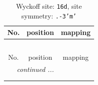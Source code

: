 \documentclass[fleqn,8pt]{jsarticle}
\begin{document}
\renewcommand{\arraystretch}{1.2}
\begin{longtable}{ccc}
\caption{Wyckoff site: {\tt 16d}, site symmetry: {\tt .-3'm'}}
 \\
 \hline \hline
No. & position & mapping \\ \hline \endfirsthead

\multicolumn{2}{l}{\tablename\ \thetable{}} \\
 \hline \hline
No. & position & mapping \\ \hline \endhead

 \hline \hline
\multicolumn{2}{r}{\footnotesize\it continued ...} \\ \endfoot

 \hline \hline
\multicolumn{2}{r}{} \\ \endlastfoot


\end{longtable}
\end{document}
